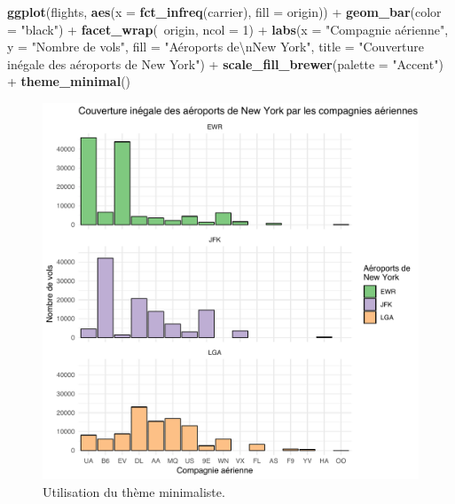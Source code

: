 \documentclass[a4paperpaper,]{article}
\newenvironment{Shaded}{\begin{snugshade}}{\end{snugshade}}
\newcommand{\CharTok}[1]{\textcolor[rgb]{0.57,0.30,0.62}{#1}}
\newcommand{\DataTypeTok}[1]{\textcolor[rgb]{0.00,0.34,0.68}{#1}}
\newcommand{\DecValTok}[1]{\textcolor[rgb]{0.69,0.50,0.00}{#1}}
\newcommand{\KeywordTok}[1]{\textcolor[rgb]{0.12,0.11,0.11}{\textbf{#1}}}
\newcommand{\NormalTok}[1]{\textcolor[rgb]{0.12,0.11,0.11}{#1}}
\newcommand{\OperatorTok}[1]{\textcolor[rgb]{0.12,0.11,0.11}{#1}}
\newcommand{\StringTok}[1]{\textcolor[rgb]{0.75,0.01,0.01}{#1}}
\begin{document}
\begin{Shaded}
\begin{Highlighting}[]
\KeywordTok{ggplot}\NormalTok{(flights, }\KeywordTok{aes}\NormalTok{(}\DataTypeTok{x =} \KeywordTok{fct_infreq}\NormalTok{(carrier), }\DataTypeTok{fill =}\NormalTok{ origin)) }\OperatorTok{+}
\StringTok{  }\KeywordTok{geom_bar}\NormalTok{(}\DataTypeTok{color =} \StringTok{"black"}\NormalTok{) }\OperatorTok{+}
\StringTok{  }\KeywordTok{facet_wrap}\NormalTok{(}\OperatorTok{~}\NormalTok{origin, }\DataTypeTok{ncol =} \DecValTok{1}\NormalTok{) }\OperatorTok{+}
\StringTok{  }\KeywordTok{labs}\NormalTok{(}\DataTypeTok{x =} \StringTok{"Compagnie aérienne"}\NormalTok{,}
       \DataTypeTok{y =} \StringTok{"Nombre de vols"}\NormalTok{,}
       \DataTypeTok{fill =} \StringTok{"Aéroports de}\CharTok{\textbackslash{}n}\StringTok{New York"}\NormalTok{,}
       \DataTypeTok{title =} \StringTok{"Couverture inégale des aéroports de New York"}\NormalTok{) }\OperatorTok{+}
\StringTok{  }\KeywordTok{scale_fill_brewer}\NormalTok{(}\DataTypeTok{palette =} \StringTok{"Accent"}\NormalTok{) }\OperatorTok{+}
\StringTok{  }\KeywordTok{theme_minimal}\NormalTok{()}
\end{Highlighting}
\end{Shaded}

\begin{figure}[htpb]

{\centering \includegraphics[width=0.9\linewidth]{figure/thememinimal-1} 

}

\caption{Utilisation du thème minimaliste.}\label{fig:thememinimal}
\end{figure}
\end{document}
